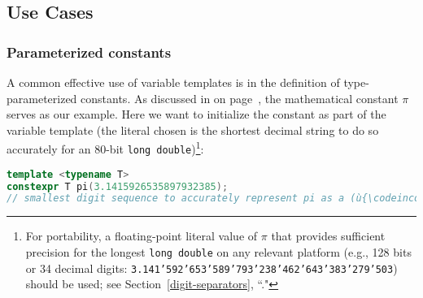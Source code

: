 \subsection[Use Cases]{Use Cases}\label{variabletemplate-use-cases}

\subsubsection[Parameterized constants]{Parameterized constants}\label{parametrized-constants}

A common effective use of variable templates is in the definition of
type-parameterized constants. As discussed in {\it{}} on page~\pageref{variabletemplate-description}, the mathematical
constant $\pi$ serves as our example. Here we want to
initialize the constant as part of the variable template (the literal
chosen is the shortest decimal string to do so accurately for an 80-bit
\texttt{long}~\texttt{double}){\cprotect\footnote{For
portability, a floating-point literal value of \(\pi\) that provides
sufficient precision for the longest \texttt{long}~\texttt{double} on
any relevant platform (e.g., 128 bits or 34 decimal digits:
\texttt{3.141'592'653'589'793'238'462'643'383'279'503}) should be
used; see Section~\ref{digit-separators}, ``."}}:

\begin{lstlisting}[language=C++]
template <typename T>
constexpr T pi(3.1415926535897932385);
// smallest digit sequence to accurately represent pi as a (ù{\codeincomments{long double}}ù)
\end{lstlisting}

